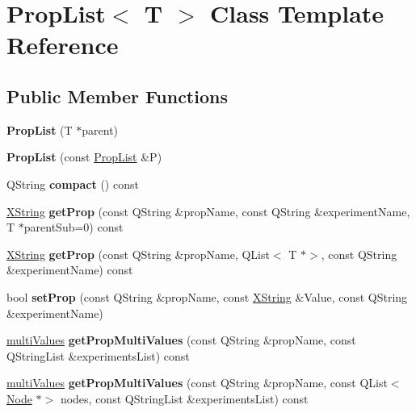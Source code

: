 \hypertarget{class_prop_list}{}\section{Prop\+List$<$ T $>$ Class Template Reference}
\label{class_prop_list}
\subsection*{Public Member Functions}
\begin{DoxyCompactItemize}
\item 
\mbox{\label{class_prop_list_a16935b829a10ddf4b02ed24cadb179b4}} 
{\bfseries Prop\+List} (T $\ast$parent)
\item 
\mbox{\label{class_prop_list_a989e98f5397bc3541e70385765d7a4df}} 
{\bfseries Prop\+List} (const \hyperlink{class_prop_list}{Prop\+List} \&P)
\item 
\mbox{\label{class_prop_list_ac58c8c04f9135c84d39a4906a21af06d}} 
Q\+String {\bfseries compact} () const
\item 
\mbox{\label{class_prop_list_a6addf466977f72e6ee0e736d9976b531}} 
\hyperlink{class_x_string}{X\+String} {\bfseries get\+Prop} (const Q\+String \&prop\+Name, const Q\+String \&experiment\+Name, T $\ast$parent\+Sub=0) const
\item 
\mbox{\label{class_prop_list_ad70facfbcbda40da4890ac54f5a65e6f}} 
\hyperlink{class_x_string}{X\+String} {\bfseries get\+Prop} (const Q\+String \&prop\+Name, Q\+List$<$ T $\ast$$>$, const Q\+String \&experiment\+Name) const
\item 
\mbox{\label{class_prop_list_aa2f75548349568226cc2685801baad57}} 
bool {\bfseries set\+Prop} (const Q\+String \&prop\+Name, const \hyperlink{class_x_string}{X\+String} \&Value, const Q\+String \&experiment\+Name)
\item 
\mbox{\label{class_prop_list_ae38dbaf286173e6de9128e704992b42a}} 
\hyperlink{classmulti_values}{multi\+Values} {\bfseries get\+Prop\+Multi\+Values} (const Q\+String \&prop\+Name, const Q\+String\+List \&experiments\+List) const
\item 
\mbox{\label{class_prop_list_afaef759ad8d2a69147e13d9d6b1766a2}} 
\hyperlink{classmulti_values}{multi\+Values} {\bfseries get\+Prop\+Multi\+Values} (const Q\+String \&prop\+Name, const Q\+List$<$ \hyperlink{class_node}{Node} $\ast$$>$ nodes, const Q\+String\+List \&experiments\+List) const
\end{DoxyCompactItemize}
